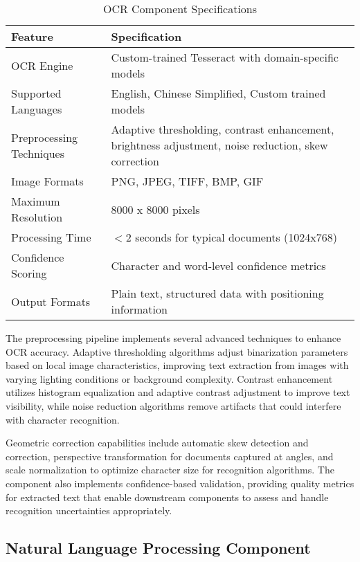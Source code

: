 \begin{table}[H]
\centering
\caption{OCR Component Specifications}
\label{tab:ocr_specifications}
\begin{tabular}{|l|p{8cm}|}
\hline
\textbf{Feature} & \textbf{Specification} \\
\hline
OCR Engine & Custom-trained Tesseract with domain-specific models \\
\hline
Supported Languages & English, Chinese Simplified, Custom trained models \\
\hline
Preprocessing Techniques & Adaptive thresholding, contrast enhancement, brightness adjustment, noise reduction, skew correction \\
\hline
Image Formats & PNG, JPEG, TIFF, BMP, GIF \\
\hline
Maximum Resolution & 8000 x 8000 pixels \\
\hline
Processing Time & $<$2 seconds for typical documents (1024x768) \\
\hline
Confidence Scoring & Character and word-level confidence metrics \\
\hline
Output Formats & Plain text, structured data with positioning information \\
\hline
\end{tabular}
\end{table}

The preprocessing pipeline implements several advanced techniques to enhance OCR accuracy. Adaptive thresholding algorithms adjust binarization parameters based on local image characteristics, improving text extraction from images with varying lighting conditions or background complexity. Contrast enhancement utilizes histogram equalization and adaptive contrast adjustment to improve text visibility, while noise reduction algorithms remove artifacts that could interfere with character recognition.

Geometric correction capabilities include automatic skew detection and correction, perspective transformation for documents captured at angles, and scale normalization to optimize character size for recognition algorithms. The component also implements confidence-based validation, providing quality metrics for extracted text that enable downstream components to assess and handle recognition uncertainties appropriately.

\subsection{Natural Language Processing Component}

